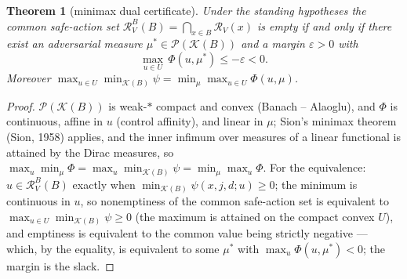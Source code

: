 \documentclass[10pt,twocolumn]{article}
\theoremstyle{plain}
\newtheorem{theorem}{Theorem}
\theoremstyle{definition}
\theoremstyle{remark}
\begin{document}
\begin{theorem}[minimax dual certificate]\label{dual-thm:dual}
Under the standing hypotheses the common safe-action set
$\mathcal{R}^{B}_{V}(B) = \bigcap_{x \in B}\mathcal{R}_{V}(x)$ is empty if
and only if there exist an adversarial measure
$\mu^{*} \in \mathscr{P}(\mathcal{K}(B))$ and a margin $\varepsilon > 0$
with
\begin{equation*}
\max_{u \in U}\,\Phi(u,\mu^{*}) \le -\varepsilon < 0.
\tag{$\star$}
\end{equation*}
Moreover
$\max_{u \in U}\min_{\mathcal{K}(B)}\psi
 = \min_{\mu}\max_{u \in U}\Phi(u,\mu)$.
\end{theorem}
\begin{proof}
$\mathscr{P}(\mathcal{K}(B))$ is weak-$*$ compact and convex (Banach --
Alaoglu), and $\Phi$ is continuous, affine in $u$ (control affinity), and
linear in $\mu$; Sion's minimax theorem (Sion, 1958) applies, and the inner infimum
over measures of a linear functional is attained by the Dirac measures,
so
$\max_{u}\min_{\mu}\Phi = \max_{u}\min_{\mathcal{K}(B)}\psi
 = \min_{\mu}\max_{u}\Phi$.
For the equivalence: $u \in \mathcal{R}^{B}_{V}(B)$ exactly when
$\min_{\mathcal{K}(B)}\psi(x,j,d;u) \ge 0$; the minimum is continuous in
$u$, so nonemptiness of the common safe-action set is equivalent to
$\max_{u \in U}\min_{\mathcal{K}(B)}\psi \ge 0$ (the maximum is attained
on the compact convex $U$), and emptiness is equivalent to the common
value being strictly negative --- which, by the equality, is equivalent to
some $\mu^{*}$ with $\max_{u}\Phi(u,\mu^{*}) < 0$; the margin is the
slack.
\end{proof}
\end{document}
